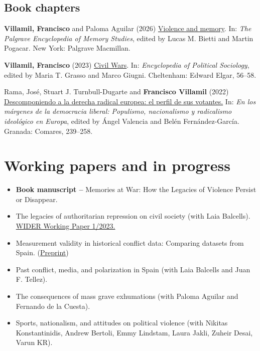 \documentclass[a4paper, 12pt]{article}
\begin{document}
\subsection*{Book chapters}

\begin{etaremune}[leftmargin=12pt, itemsep=0pt]
\item \textbf{Villamil, Francisco} and Paloma Aguilar (2026) \href{https://doi.org/10.1007/978-3-030-93789-8_49-1}{Violence and memory}. In: \textit{The Palgrave Encyclopedia of Memory Studies}, edited by Lucas M. Bietti and Martin Pogacar. New York: Palgrave Macmillan. %
\item \textbf{Villamil, Francisco} (2023) \href{https://doi.org/10.4337/9781803921235.00020}{Civil Wars}. In: \textit{Encyclopedia of Political Sociology}, edited by Maria T. Grasso and Marco Giugni. Cheltenham: Edward Elgar, 56--58. %
\item Rama, José, Stuart J. Turnbull-Dugarte and \textbf{Francisco Villamil} (2022) \href{https://www.comares.com/libro/en-los-margenes-de-la-democracia-liberal_143816/}{Descomponiendo a la derecha radical europea: el perfil de sus votantes.} In: \textit{En los márgenes de la democracia liberal: Populismo, nacionalismo y radicalismo ideológico en Europa}, edited by Ángel Valencia and Belén Fernández-García. Granada: Comares, 239--258. %
\end{etaremune}

\section*{Working papers and in progress}

\begin{itemize}[leftmargin=*, nolistsep]
\item \textbf{Book manuscript --} Memories at War: How the Legacies of Violence Persist or Disappear. 
\item The legacies of authoritarian repression on civil society (with Laia Balcells).\\\href{https://doi.org/10.35188/UNU-WIDER/2023/309-3}{WIDER Working Paper 1/2023.}
\item Measurement validity in historical conflict data: Comparing datasets from Spain. (\href{https://osf.io/c6wgk/}{Preprint})
\item Past conflict, media, and polarization in Spain (with Laia Balcells and Juan F. Tellez).
\item The consequences of mass grave exhumations (with Paloma Aguilar and Fernando de la Cuesta).
\item Sports, nationalism, and attitudes on political violence (with Nikitas Konstantinidis, Andrew Bertoli, Emmy Lindstam, Laura Jakli, Zuheir Desai, Varun KR).
\end{itemize}
\end{document}
